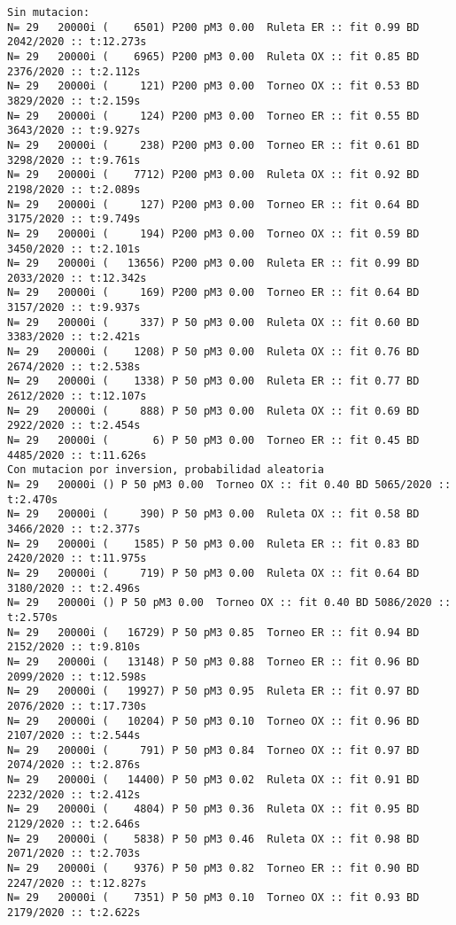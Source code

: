 \documentclass[10pt]{article}
\begin{document}
\begin{Verbatim}
Sin mutacion:
N= 29   20000i (    6501) P200 pM3 0.00  Ruleta ER :: fit 0.99 BD 2042/2020 :: t:12.273s
N= 29   20000i (    6965) P200 pM3 0.00  Ruleta OX :: fit 0.85 BD 2376/2020 :: t:2.112s
N= 29   20000i (     121) P200 pM3 0.00  Torneo OX :: fit 0.53 BD 3829/2020 :: t:2.159s
N= 29   20000i (     124) P200 pM3 0.00  Torneo ER :: fit 0.55 BD 3643/2020 :: t:9.927s
N= 29   20000i (     238) P200 pM3 0.00  Torneo ER :: fit 0.61 BD 3298/2020 :: t:9.761s
N= 29   20000i (    7712) P200 pM3 0.00  Ruleta OX :: fit 0.92 BD 2198/2020 :: t:2.089s
N= 29   20000i (     127) P200 pM3 0.00  Torneo ER :: fit 0.64 BD 3175/2020 :: t:9.749s
N= 29   20000i (     194) P200 pM3 0.00  Torneo OX :: fit 0.59 BD 3450/2020 :: t:2.101s
N= 29   20000i (   13656) P200 pM3 0.00  Ruleta ER :: fit 0.99 BD 2033/2020 :: t:12.342s
N= 29   20000i (     169) P200 pM3 0.00  Torneo ER :: fit 0.64 BD 3157/2020 :: t:9.937s
N= 29   20000i (     337) P 50 pM3 0.00  Ruleta OX :: fit 0.60 BD 3383/2020 :: t:2.421s
N= 29   20000i (    1208) P 50 pM3 0.00  Ruleta OX :: fit 0.76 BD 2674/2020 :: t:2.538s
N= 29   20000i (    1338) P 50 pM3 0.00  Ruleta ER :: fit 0.77 BD 2612/2020 :: t:12.107s
N= 29   20000i (     888) P 50 pM3 0.00  Ruleta OX :: fit 0.69 BD 2922/2020 :: t:2.454s
N= 29   20000i (       6) P 50 pM3 0.00  Torneo ER :: fit 0.45 BD 4485/2020 :: t:11.626s
Con mutacion por inversion, probabilidad aleatoria
N= 29   20000i () P 50 pM3 0.00  Torneo OX :: fit 0.40 BD 5065/2020 :: t:2.470s
N= 29   20000i (     390) P 50 pM3 0.00  Ruleta OX :: fit 0.58 BD 3466/2020 :: t:2.377s
N= 29   20000i (    1585) P 50 pM3 0.00  Ruleta ER :: fit 0.83 BD 2420/2020 :: t:11.975s
N= 29   20000i (     719) P 50 pM3 0.00  Ruleta OX :: fit 0.64 BD 3180/2020 :: t:2.496s
N= 29   20000i () P 50 pM3 0.00  Torneo OX :: fit 0.40 BD 5086/2020 :: t:2.570s
N= 29   20000i (   16729) P 50 pM3 0.85  Torneo ER :: fit 0.94 BD 2152/2020 :: t:9.810s
N= 29   20000i (   13148) P 50 pM3 0.88  Torneo ER :: fit 0.96 BD 2099/2020 :: t:12.598s
N= 29   20000i (   19927) P 50 pM3 0.95  Ruleta ER :: fit 0.97 BD 2076/2020 :: t:17.730s
N= 29   20000i (   10204) P 50 pM3 0.10  Torneo OX :: fit 0.96 BD 2107/2020 :: t:2.544s
N= 29   20000i (     791) P 50 pM3 0.84  Torneo OX :: fit 0.97 BD 2074/2020 :: t:2.876s
N= 29   20000i (   14400) P 50 pM3 0.02  Ruleta OX :: fit 0.91 BD 2232/2020 :: t:2.412s
N= 29   20000i (    4804) P 50 pM3 0.36  Ruleta OX :: fit 0.95 BD 2129/2020 :: t:2.646s
N= 29   20000i (    5838) P 50 pM3 0.46  Ruleta OX :: fit 0.98 BD 2071/2020 :: t:2.703s
N= 29   20000i (    9376) P 50 pM3 0.82  Torneo ER :: fit 0.90 BD 2247/2020 :: t:12.827s
N= 29   20000i (    7351) P 50 pM3 0.10  Torneo OX :: fit 0.93 BD 2179/2020 :: t:2.622s
\end{Verbatim}
\end{document}
